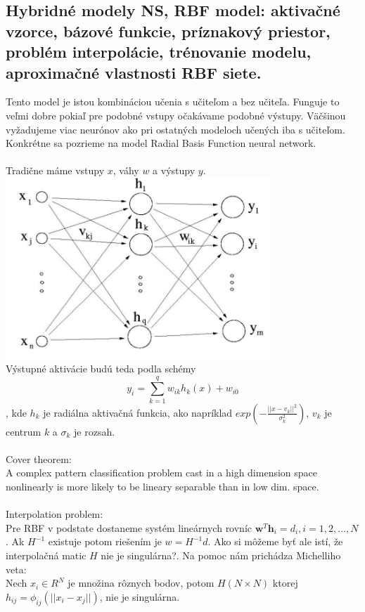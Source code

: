 \documentclass{article}
\numberwithin{equation}{section} %
\begin{document}
\subsection{Hybridné modely NS, RBF model: aktivačné vzorce, bázové funkcie, príznakový priestor, problém interpolácie, trénovanie modelu, aproximačné vlastnosti RBF siete.}
Tento model je istou kombináciou učenia s učiteľom a bez učiteľa. Funguje to veľmi dobre pokiaľ pre podobné vstupy očakávame podobné výstupy. Väčšinou vyžadujeme viac neurónov ako pri ostatných modeloch učených iba s učiteľom. Konkrétne sa pozrieme na model Radial Basis Function neural network.
\\\\
Tradične máme vstupy $x$, váhy $w$ a výstupy $y$.\\
\includegraphics[width=10cm]{imgs/rbf}\\
Výstupné aktivácie budú teda podla schémy
 $$y_i = \sum^q_{k=1}w_{ik}h_k(x) + w_{i0} $$, kde $h_k$ je radiálna aktivačná funkcia, ako napríklad $exp(-\frac{||x-v_k||^2}{\sigma_k^2})$, $v_k$ je centrum $k$ a $\sigma_k$ je rozsah. 
\\\\
Cover theorem: \\
A complex pattern classification problem cast in a high dimension space nonlinearly is more likely to be lineary separable than in low dim. space.
\\\\
Interpolation problem:\\
Pre RBF v podstate dostaneme systém lineárnych rovníc $\textbf{w}^T\textbf{h}_i = d_i, i=1,2,\dots,N$. Ak $H^{-1}$ existuje potom riešením je $w = H^{-1}d$. Ako si môžeme byť ale istí, že interpolačná matic $H$ nie je singulárna?. Na pomoc nám prichádza Michelliho veta: \\

Nech $x_i \in R^N$ je množina rôznych bodov, potom $H(N\times N)$ ktorej $h_{ij} = \phi_{ij}(||x_i - x_j||)$, nie je singulárna. 
\end{document}
